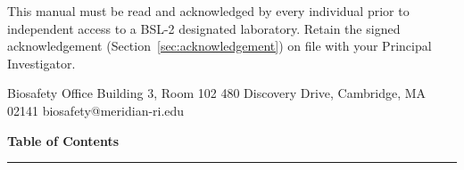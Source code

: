 \documentclass[11pt, a4paper]{article}
\begin{document}
\begin{titlepage}
\vspace{1.6cm}
\hspace{1.4cm}
\begin{minipage}{0.82\linewidth}
\begin{dangerbox}
\small
This manual must be read and acknowledged by every individual prior to independent
access to a BSL-2 designated laboratory. Retain the signed acknowledgement
(Section~\ref{sec:acknowledgement}) on file with your Principal Investigator.
\end{dangerbox}
\end{minipage}

\vfill
\hspace{1.4cm}\color{BSLrule}\sffamily\footnotesize
Biosafety Office \textbullet{} Building 3, Room 102 \textbullet{} 480 Discovery Drive, Cambridge, MA 02141 \textbullet{} biosafety@meridian-ri.edu
\vspace{1.2cm}

\end{titlepage}

\thispagestyle{plain}
\begin{center}
  {\color{BSLdark}\sffamily\bfseries\Large Table of Contents}\\[2pt]
  \color{BSLamber}\rule{0.28\linewidth}{1.5pt}
\end{center}
\vspace{6pt}
\tableofcontents
\clearpage


\clearpage


\clearpage


\clearpage


\clearpage


\clearpage



\clearpage
\begingroup
\small


\endgroup
\end{document}
